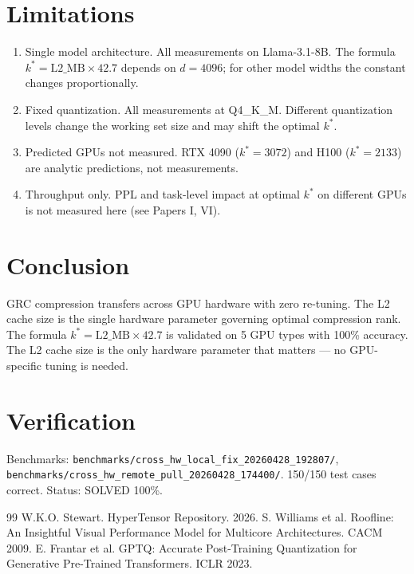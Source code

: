 \documentclass[11pt,a4paper]{article}
\begin{document}
\section{Limitations}

\begin{enumerate}
\item Single model architecture. All measurements on
      Llama-3.1-8B. The formula $k^* = \mathrm{L2\_MB} \times 42.7$
      depends on $d{=}4096$; for other model widths the constant changes
      proportionally.
\item Fixed quantization. All measurements at Q4\_K\_M.
      Different quantization levels change the working set size and may
      shift the optimal $k^*$.
\item Predicted GPUs not measured. RTX 4090 ($k^*{=}3072$) and
      H100 ($k^*{=}2133$) are analytic predictions, not measurements.
\item Throughput only. PPL and task-level impact at optimal
      $k^*$ on different GPUs is not measured here (see Papers I, VI).
\end{enumerate}

\section{Conclusion}

GRC compression transfers across GPU hardware with zero re-tuning. The
L2 cache size is the single hardware parameter governing optimal
compression rank. The formula $k^* = \mathrm{L2\_MB} \times 42.7$ is
validated on 5 GPU types with 100\% accuracy. The L2 cache size is the only hardware parameter that matters — no GPU-specific tuning is needed.

\section{Verification}

Benchmarks: \texttt{benchmarks/cross\_hw\_local\_fix\_20260428\_192807/},
\texttt{benchmarks/cross\_hw\_remote\_pull\_20260428\_174400/}.
150/150 test cases correct. Status: SOLVED 100\%.

\begin{thebibliography}{99}
 W.K.O. Stewart. HyperTensor Repository. 2026.
 S. Williams et al. Roofline: An Insightful Visual
Performance Model for Multicore Architectures. CACM 2009.
 E. Frantar et al. GPTQ: Accurate Post-Training Quantization
for Generative Pre-Trained Transformers. ICLR 2023.
\end{thebibliography}
\end{document}
